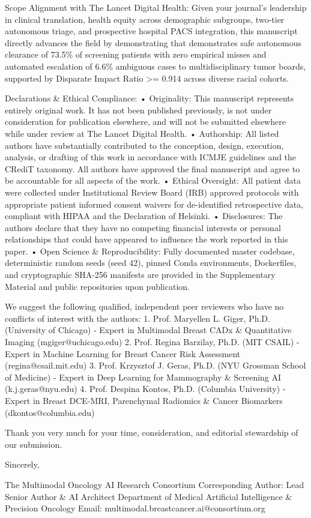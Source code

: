 \documentclass[11pt]{article}
\begin{document}
Scope Alignment with The Lancet Digital Health:
Given your journal's leadership in clinical translation, health equity across demographic subgroups, two-tier autonomous triage, and prospective hospital PACS integration, this manuscript directly advances the field by demonstrating that demonstrates safe autonomous clearance of 73.5\% of screening patients with zero empirical misses and automated escalation of 6.6\% ambiguous cases to multidisciplinary tumor boards, supported by Disparate Impact Ratio >= 0.914 across diverse racial cohorts.

Declarations \& Ethical Compliance:
• Originality: This manuscript represents entirely original work. It has not been published previously, is not under consideration for publication elsewhere, and will not be submitted elsewhere while under review at The Lancet Digital Health.
• Authorship: All listed authors have substantially contributed to the conception, design, execution, analysis, or drafting of this work in accordance with ICMJE guidelines and the CRediT taxonomy. All authors have approved the final manuscript and agree to be accountable for all aspects of the work.
• Ethical Oversight: All patient data were collected under Institutional Review Board (IRB) approved protocols with appropriate patient informed consent waivers for de-identified retrospective data, compliant with HIPAA and the Declaration of Helsinki.
• Disclosures: The authors declare that they have no competing financial interests or personal relationships that could have appeared to influence the work reported in this paper.
• Open Science \& Reproducibility: Fully documented master codebase, deterministic random seeds (seed 42), pinned Conda environments, Dockerfiles, and cryptographic SHA-256 manifests are provided in the Supplementary Material and public repositories upon publication.

We suggest the following qualified, independent peer reviewers who have no conflicts of interest with the authors:
1. Prof. Maryellen L. Giger, Ph.D. (University of Chicago) - Expert in Multimodal Breast CADx \& Quantitative Imaging (mgiger@uchicago.edu)
2. Prof. Regina Barzilay, Ph.D. (MIT CSAIL) - Expert in Machine Learning for Breast Cancer Risk Assessment (regina@csail.mit.edu)
3. Prof. Krzysztof J. Geras, Ph.D. (NYU Grossman School of Medicine) - Expert in Deep Learning for Mammography \& Screening AI (k.j.geras@nyu.edu)
4. Prof. Despina Kontos, Ph.D. (Columbia University) - Expert in Breast DCE-MRI, Parenchymal Radiomics \& Cancer Biomarkers (dkontos@columbia.edu)

Thank you very much for your time, consideration, and editorial stewardship of our submission.

Sincerely,

The Multimodal Oncology AI Research Consortium
Corresponding Author: Lead Senior Author \& AI Architect
Department of Medical Artificial Intelligence \& Precision Oncology
Email: multimodal.breastcancer.ai@consortium.org
\end{document}
